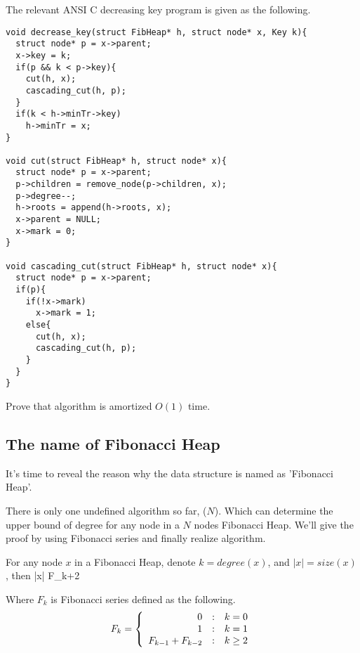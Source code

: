 \documentclass{article}
\begin{document}
The relevant ANSI C decreasing key program is given as the following.

\lstset{language=C}
\begin{lstlisting}
void decrease_key(struct FibHeap* h, struct node* x, Key k){
  struct node* p = x->parent;
  x->key = k;
  if(p && k < p->key){
    cut(h, x);
    cascading_cut(h, p);
  }
  if(k < h->minTr->key)
    h->minTr = x;
}

void cut(struct FibHeap* h, struct node* x){
  struct node* p = x->parent;
  p->children = remove_node(p->children, x);
  p->degree--;
  h->roots = append(h->roots, x);
  x->parent = NULL;
  x->mark = 0;
}

void cascading_cut(struct FibHeap* h, struct node* x){
  struct node* p = x->parent;
  if(p){
    if(!x->mark)
      x->mark = 1;
    else{
      cut(h, x);
      cascading_cut(h, p);
    }
  }
}
\end{lstlisting}

\begin{Exercise}
Prove that  algorithm is amortized $O(1)$ time.
\end{Exercise}

\subsection{The name of Fibonacci Heap}
It's time to reveal the reason why the data structure is named
as 'Fibonacci Heap'.

There is only one undefined algorithm so far, ($N$).
Which can determine the upper bound of degree for any node in a $N$ nodes 
Fibonacci Heap. We'll give the proof by using Fibonacci series and
finally realize  algorithm.

\begin{lemma}
\label{lemma:Fib-degree}
For any node $x$ in a Fibonacci Heap, denote $k = degree(x)$, and
$|x| = size(x)$, then
\be
  |x| \geq F_{k+2}
\ee

Where $F_k$ is Fibonacci series defined as the following.
\[
F_k = \left \{
  \begin{array}
  {r@{\quad:\quad}l}
  0 & k = 0 \\
  1 & k = 1 \\
  F_{k-1} + F_{k-2} & k \geq 2 
  \end{array}
\right.
\]
\end{lemma}
\end{document}

